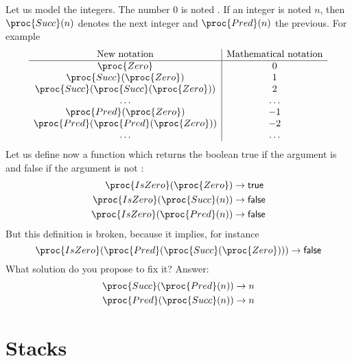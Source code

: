 \documentclass[11pt,a4paper]{article}
\newcommand{\true}{\textsf{true}\xspace}
\newcommand{\false}{\textsf{false}\xspace}
\newcommand\rname[1]{\langle{#1}\rangle}
\begin{document}
Let us model the integers. The number \(0\) is noted . If
an integer is noted \(n\), then \(\proc{Succ} (n)\) denotes the next
integer and \(\proc{Pred} (n)\) the previous. For example
\[
\begin{array}{c|c}
\text{New notation} & \text{Mathematical notation}\\
\hline
\proc{Zero} & 0\\
\proc{Succ} (\proc{Zero}) & 1\\
\proc{Succ} (\proc{Succ} (\proc{Zero})) & 2\\
\ldots & \ldots\\
\proc{Pred} (\proc{Zero}) & -1\\
\proc{Pred} (\proc{Pred} (\proc{Zero})) & -2\\
\ldots & \ldots
\end{array}
\]
Let us define now a function  which returns the boolean
\true if the argument is  and \false if the argument is not
:
\begin{align*}
\proc{IsZero} (\proc{Zero}) & \rightarrow \true\\
\proc{IsZero} (\proc{Succ} (n)) & \rightarrow \false\\
\proc{IsZero} (\proc{Pred} (n)) & \rightarrow \false
\end{align*}
But this definition is broken, because it implies, for instance
\[
\proc{IsZero} (\proc{Pred} (\proc{Succ} (\proc{Zero}))) \rightarrow
\false
\]
What solution do you propose to fix it? Answer:
\begin{align*}
\proc{Succ} (\proc{Pred} (n)) & \rightarrow n\\
\proc{Pred} (\proc{Succ} (n)) & \rightarrow n
\end{align*}


\section{Stacks}

\end{document}
